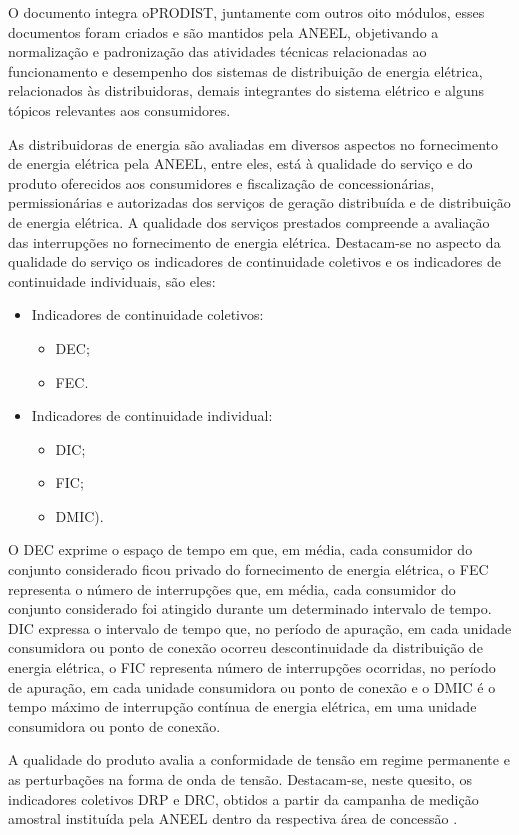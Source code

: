 \par 
O documento \cite{MOD08} integra o\ac{PRODIST}, juntamente com outros oito módulos, esses documentos foram criados e são mantidos pela \ac{ANEEL}, objetivando a normalização e padronização das atividades técnicas relacionadas ao funcionamento e desempenho dos sistemas de distribuição de energia elétrica, relacionados às distribuidoras, demais integrantes do sistema elétrico e alguns tópicos relevantes aos consumidores.
\par
As distribuidoras de energia são avaliadas em diversos aspectos no fornecimento de energia elétrica pela ANEEL, entre eles, está à qualidade do serviço e do produto oferecidos aos consumidores e fiscalização de concessionárias, permissionárias e autorizadas dos serviços de geração distribuída e de distribuição de energia elétrica. A qualidade dos serviços prestados compreende a avaliação das interrupções no fornecimento de energia elétrica. Destacam-se no aspecto da qualidade do serviço os indicadores de continuidade coletivos e os indicadores de continuidade individuais, são eles:
\begin{itemize}
\item Indicadores de continuidade coletivos:
	\begin{itemize}
		\item \ac{DEC}; 
		\item \ac{FEC}.	
	\end{itemize}
\item Indicadores de continuidade individual:
	\begin{itemize}
		\item \ac{DIC};
		\item \ac{FIC};
		\item \ac{DMIC}).
	\end{itemize}
\end{itemize}
\par
O \ac{DEC} exprime o espaço de tempo em que, em média, cada consumidor do conjunto considerado ficou privado do fornecimento de energia elétrica, o \ac{FEC} representa o número de interrupções que, em média, cada consumidor do conjunto considerado foi atingido durante um determinado intervalo de tempo. \ac{DIC} expressa o intervalo de tempo que, no período de apuração, em cada unidade consumidora ou ponto de conexão ocorreu descontinuidade da distribuição de energia elétrica, o \ac{FIC} representa número de interrupções ocorridas, no período de apuração, em cada unidade consumidora ou ponto de conexão e o \ac{DMIC} é o tempo máximo de interrupção contínua de energia elétrica, em uma unidade consumidora ou ponto de conexão.
\par 
A qualidade do produto avalia a conformidade de tensão em regime permanente e as perturbações na forma de onda de tensão. Destacam-se, neste quesito, os indicadores coletivos \ac{DRP} e \ac{DRC}, obtidos a partir da campanha de medição amostral instituída pela \ac{ANEEL} dentro da respectiva área de concessão \cite{ANEE2}.

